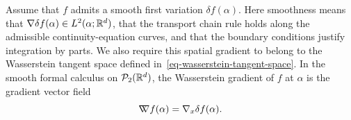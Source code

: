 \begin{defn}\label{def-wasserstein-gradient}
	Assume that $f$ admits a smooth first variation $\delta f(\alpha)$. Here smoothness means that $\nabla\delta f(\alpha)\in L^2(\alpha;\mathbb{R}^d)$, that the transport chain rule holds along the admissible continuity-equation curves, and that the boundary conditions justify integration by parts. We also require this spatial gradient to belong to the Wasserstein tangent space defined in~\eqref{eq-wasserstein-tangent-space}. In the smooth formal calculus on $\mathcal{P}_2(\mathbb{R}^d)$, the Wasserstein gradient of $f$ at $\alpha$ is the gradient vector field
	\begin{equation*}
	    \mathord{\nabla\mkern-9.3mu\nabla} f(\alpha) = \nabla_x \delta f(\alpha).
	\end{equation*}
\end{defn}



